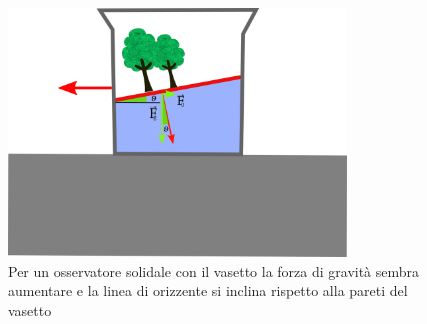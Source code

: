 \documentclass[a4paper,10pt,oneside]{article}
\begin{document}
\begin{figure}[H]
 \centering
 \includegraphics[width=0.8\textwidth]{../immagini/vasetto_disegno.png}
\caption{Per un osservatore solidale con il vasetto la forza di gravità sembra aumentare e la linea di orizzente si inclina rispetto alla pareti del vasetto} \label{fig:vasetto_rappresentazione}
\end{figure}
\end{document}
